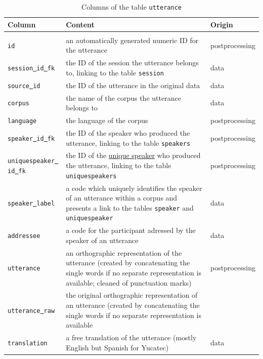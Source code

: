 \documentclass[a4paper, 11pt]{book}
\newcommand{\und}{\underline{{ }}\hspace{0.2mm}}	%
\begin{document}
\begin{longtable}{lp{.5\linewidth}p{.2\linewidth}}
	\toprule
		\textbf{Column} & \textbf{Content} 	& \textbf{Origin} \\
	\midrule
	\endhead
	
	\bottomrule\\[-0.15cm]
	\caption{Columns of the table \texttt{utterance}}
	\endfoot

		\texttt{id}				& an automatically generated numeric ID for the utterance & postprocessing \\
		\texttt{session\und id\und fk} & the ID of the session the utterance belongs to, linking to the table \texttt{session} & data \\
		\texttt{source\und id} 	& the ID of the utterance in the original data & data \\
		\texttt{corpus}			& the name of the corpus the utterance belongs to & data \\
		\texttt{language}		& the language of the corpus & postprocessing \\
		\texttt{speaker\und id\und fk} & the ID of the speaker who produced the utterance, linking to the table \texttt{speakers} & postprocessing \\
		\texttt{uniquespeaker\und id\und fk} & the ID of the \hyperref[subsec:Table uniquespeakers]{unique speaker} who produced the utterance, linking to the table \texttt{uniquespeakers} & postprocessing \\
		\texttt{speaker\und label} & a code which uniquely identifies the speaker of an utterance within a corpus and presents a link to the tables \texttt{speaker} and \texttt{uniquespeaker} & data \\
		\texttt{addressee}		& a code for the participant adressed by the speaker of an utterance & data \\
		\texttt{utterance}		& an orthographic representation of the utterance (created by concatenating the single words if no separate representation is available; cleaned of punctuation marks) & postprocessing \\
		\texttt{utterance\und raw} & the original orthographic representation of an utterance (created by concatenating the single words if no separate representation is available &  \\ 
		\texttt{translation}	& a free translation of the utterance (mostly English but Spanish for Yucatec) & data \\

\end{longtable}
\end{document}
